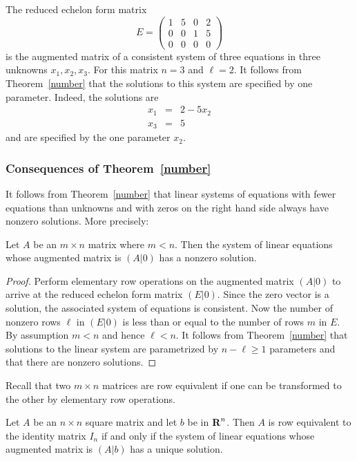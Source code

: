 \documentclass{ximera}
\begin{document}
The reduced echelon form matrix
\[
E = \left(\begin{array}{ccc|c} 1 & 5 & 0 & 2 \\ 0 & 0 & 1 & 5\\
	0 & 0 & 0 & 0 \end{array}\right)
\]
is the augmented matrix of a consistent system of three equations
in three unknowns $x_1,x_2,x_3$.  For this matrix $n=3$ and $\ell=2$.
It follows from Theorem~\ref{number} that the solutions to this system
are specified by one parameter.  Indeed, the solutions are
\begin{eqnarray*}
x_1 & = & 2 - 5x_2\\
x_3 & = & 5
\end{eqnarray*}
and are specified by the one parameter $x_2$.


\subsubsection*{Consequences of Theorem~\ref{number}}

It follows from Theorem~\ref{number} that linear systems of equations
with fewer equations than unknowns and with zeros on the right hand
side always have nonzero solutions.  More precisely:
\begin{cor}  \label{existencehomo}
Let $A$ be an $m\times n$ matrix where $m<n$.  Then the system of
linear equations whose augmented matrix is $(A|0)$ has a nonzero
solution.
\end{cor}

\begin{proof} Perform elementary row operations on the augmented matrix $(A|0)$
to arrive at the reduced echelon form matrix $(E|0)$.  Since the zero
vector is a solution, the associated system of equations is consistent.
Now the number of nonzero rows $\ell$ in $(E|0)$ is less than or equal to
the number of rows $m$ in $E$.  By assumption $m<n$ and hence $\ell<n$.
It follows from Theorem~\ref{number} that solutions to the linear system
are parametrized by $n-\ell \ge 1$ parameters and that there are nonzero
solutions.   \end{proof}

Recall that two $m\times n$ matrices are row equivalent if one
can be transformed to the other by elementary row operations.

\begin{cor}  \label{consistent}
Let $A$ be an $n\times n$ square matrix and let $b$ be in
$\mbox{$\bf{R}$}^n$.  Then $A$ is row equivalent to the identity matrix $I_n$
if and only if the system of linear equations whose augmented
matrix is $(A|b)$ has a unique solution.
\end{cor}   
\end{document}
